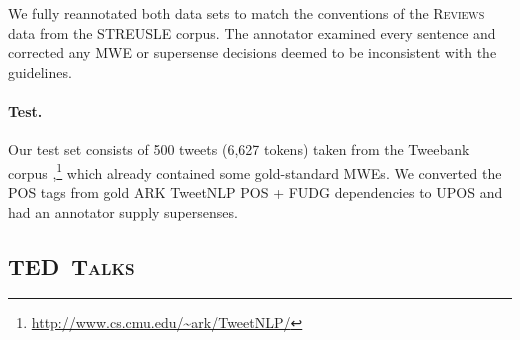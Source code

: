 \documentclass[11pt,letterpaper]{article}
\newcommand{\ensuretext}[1]{#1}
\newcommand{\nssmarker}{\ensuretext{\textcolor{magenta}{\ensuremath{^{\textsc{NS}}_{\textsc{S}}}}}}
\newcommand{\arkcomment}[3]{\ensuretext{\textcolor{#3}{[#1 #2]}}}
\newcommand{\nss}[1]{\arkcomment{\nssmarker}{#1}{magenta}}
\newcommand{\dataset}[1]{\mbox{\textsc{#1}}}	%
\begin{document}
We fully reannotated both data sets to match the conventions of the \dataset{Reviews} data from the STREUSLE corpus. 
The annotator examined every sentence and corrected any MWE or supersense decisions deemed to be inconsistent with the guidelines.


\paragraph{Test.}
Our test set consists of 500 tweets (6,627 tokens) taken from the Tweebank corpus \citep{kong-14},\footnote{\url{http://www.cs.cmu.edu/~ark/TweetNLP/}} 
which already contained some gold-standard MWEs. 
We converted the POS tags from gold ARK TweetNLP POS + FUDG dependencies to UPOS 
and had an annotator supply supersenses.


\subsection{\dataset{TED Talks}}
\end{document}
